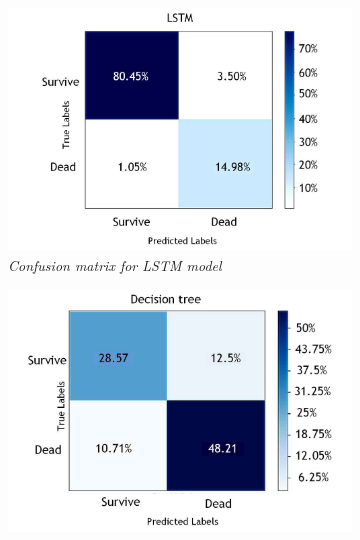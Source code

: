 \begin{figure}[hbt!]
    \centering
    \begin{subfigure}[b]{0.45\linewidth}
        \centering
        \includegraphics[width=\linewidth, height=\linewidth]{images/LSTM_Con.pdf}
        \caption{\textit{Confusion matrix for LSTM model}}
        \label{fig:figure11}
    \end{subfigure}
    \hfill
    \begin{subfigure}[b]{0.45\linewidth}
        \centering
        \includegraphics[width=\linewidth, height=\linewidth]{images/DecisionTree_Con.pdf}

\end{subfigure}
\end{figure}
